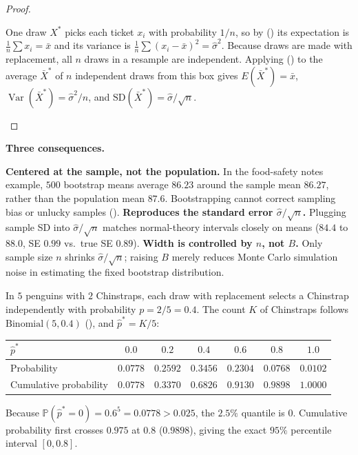 \documentclass[10pt]{scrartcl}
\begin{document}
\begin{proof}
  \begin{steps}
    \ii One draw $X^*$ picks each ticket $x_i$ with probability $1/n$, so by () its expectation is $\frac{1}{n}\sum x_i = \bar x$ and its variance is $\frac{1}{n}\sum (x_i - \bar x)^2 = \hat\sigma^2$.
    \ii Because draws are made with replacement, all $n$ draws in a resample are independent.
    \ii Applying () to the average $\bar X^*$ of $n$ independent draws from this box gives $E(\bar X^*) = \bar x$, $\operatorname{Var}(\bar X^*) = \hat\sigma^2/n$, and $\mathrm{SD}(\bar X^*) = \hat\sigma/\sqrt{n}$.
  \end{steps}
\end{proof}

\noindent\textbf{Three consequences.}
\begin{itemize}
  \ii \textbf{Centered at the sample, not the population.} In the food-safety notes example, $500$ bootstrap means average $86.23$ around the sample mean $86.27$, rather than the population mean $87.6$. Bootstrapping cannot correct sampling bias or unlucky samples ().
  \ii \textbf{Reproduces the standard error $\hat\sigma/\sqrt n$.} Plugging sample SD into $\hat\sigma/\sqrt{n}$ matches normal-theory intervals closely on means ($84.4$ to $88.0$, SE $0.99$ vs.\ true SE $0.89$).
  \ii \textbf{Width is controlled by $n$, not $B$.} Only sample size $n$ shrinks $\hat\sigma/\sqrt{n}$; raising $B$ merely reduces Monte Carlo simulation noise in estimating the fixed bootstrap distribution.
\end{itemize}

\begin{example*}
  In $5$ penguins with $2$ Chinstraps, each draw with replacement selects a Chinstrap independently with probability $p = 2/5 = 0.4$. The count $K$ of Chinstraps follows $\mathrm{Binomial}(5, 0.4)$ (), and $\hat p^* = K/5$:

  \begin{center}
  \small
  \renewcommand{\arraystretch}{1.18}
  \begin{tabular}{@{}lcccccc@{}}
  \toprule
  $\hat p^*$ & $0.0$ & $0.2$ & $0.4$ & $0.6$ & $0.8$ & $1.0$ \\
  \midrule
  Probability & $0.0778$ & $0.2592$ & $0.3456$ & $0.2304$ & $0.0768$ & $0.0102$ \\
  Cumulative probability & $0.0778$ & $0.3370$ & $0.6826$ & $0.9130$ & $0.9898$ & $1.0000$ \\
  \bottomrule
  \end{tabular}
  \end{center}

  \medskip
  Because $\mathbb P(\hat p^* = 0) = 0.6^5 = 0.0778 > 0.025$, the $2.5\%$ quantile is $0$. Cumulative probability first crosses $0.975$ at $0.8$ ($0.9898$), giving the exact $95\%$ percentile interval $[0, 0.8]$.
\end{example*}
\end{document}
